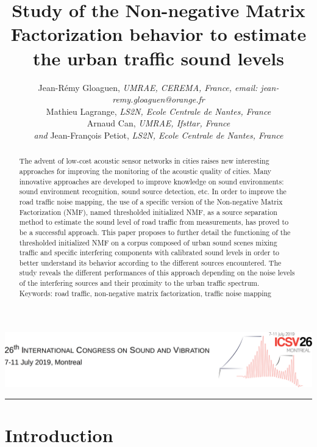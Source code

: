 \documentclass[12pt,english,twoside]{article}
\title{Study of the Non-negative Matrix Factorization behavior to estimate the urban traffic sound levels}
\author{
Jean-R\'emy Gloaguen, {\small \textit{UMRAE, CEREMA, France, email: jean-remy.gloaguen@orange.fr}}
\medskip
\\
Mathieu Lagrange, {\small \textit{LS2N, Ecole Centrale de Nantes, France}}
\medskip
\\
Arnaud Can, {\small \textit{UMRAE, Ifsttar, France}}
\medskip
\\
\emph{and} Jean-Fran\c cois Petiot,
{\small \textit{LS2N, Ecole Centrale de Nantes, France}}}
\makeatletter
\def\maketitle{
  \thispagestyle{firstpage}
\noindent\includegraphics[width=\textwidth]{ICSV26-header.png}\\
  {
   \fontsize{17}{20}\selectfont\sffamily{}  \noindent \MakeUppercase{\textbf{\@title}}

   \bigskip
   \fontsize{14}{20}\selectfont\rmfamily{} \noindent \@author
  }
}
\makeatother
\begin{document}
\maketitle

\renewcommand{\abstractname}{\vspace{-\baselineskip}} %

\begin{abstract}	\noindent
The advent of low-cost acoustic sensor networks in cities raises new interesting approaches for improving the monitoring of the acoustic quality of cities. Many innovative approaches are developed to improve knowledge on sound environments: sound environment recognition, sound source detection, etc. In order to improve the road traffic noise mapping, the use of a specific version of the Non-negative Matrix Factorization (NMF), named thresholded initialized NMF, as a source separation method to estimate the sound level of road traffic from measurements, has proved to be a successful approach.
This paper proposes to further detail the functioning of the thresholded initialized NMF on a corpus composed of urban sound scenes mixing traffic and specific interfering components with calibrated sound levels in order to better understand its behavior according to the different sources encountered.
The study reveals the different performances of this approach depending on the noise levels of the interfering sources and their proximity to the urban traffic spectrum.\\

\noindent Keywords: road traffic, non-negative matrix factorization, traffic noise mapping
\end{abstract}

\quad\rule{425pt}{0.4pt}


\section{Introduction}
\end{document}
